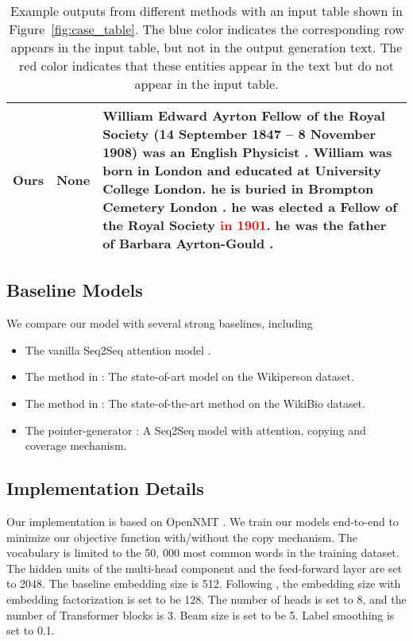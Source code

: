 \documentclass[11pt,a4paper]{article}
\begin{document}
\begin{table*}[t]
\begin{tabularx}{\textwidth}{l|p{2cm}|X}
         \hline
         Ours & None& \small{William Edward Ayrton Fellow of the Royal Society (14 September 1847 -- 8 November 1908) was an English Physicist . William was born in London and educated at University College London. he is buried in Brompton Cemetery London . he was elected a Fellow of the Royal Society \textcolor{red}{\textbf{in 1901}}. he was the father of Barbara Ayrton-Gould .}\\
         \hline\hline
    \end{tabularx}
    \caption{Example outputs from different methods with an input table shown in Figure~\ref{fig:case_table}. The blue color indicates the corresponding row appears in the input table, but not in the output generation text. The red color indicates that these entities appear in the text but do not appear in the input table.}
    \label{tab:gen_example_1}
    \vspace{-0.4cm}
\end{table*}



\subsection{Baseline Models}

We compare our model with several strong baselines, including
\begin{itemize}
    \vspace{-0.2cm}
    \item The vanilla Seq2Seq attention model \cite{Bahdanau2015}.
    \vspace{-0.2cm}
    \item  The method in \cite{Wang2018}: The state-of-art model on the Wikiperson dataset. 
    \vspace{-0.2cm}
    \item The method in \cite{structure2018}: The state-of-the-art method on the WikiBio dataset.
    \vspace{-0.2cm}
    \item The pointer-generator \cite{see2017}: A Seq2Seq model with attention, copying and coverage mechanism.
\end{itemize}



\subsection{Implementation Details}
Our implementation is based on OpenNMT \cite{opennmt}. We train our models end-to-end to minimize our objective function with/without the copy mechanism.
The vocabulary is limited to the 50, 000 most common words in the training dataset. The hidden units of the multi-head component and the feed-forward layer are set to 2048. The baseline embedding size is 512. Following \cite{ALBERT2019}, the embedding size with embedding factorization is set to be 128. The number of heads is set to 8, and the number of Transformer blocks is 3. Beam size is set to be 5. Label smoothing is set to 0.1.
\end{document}

